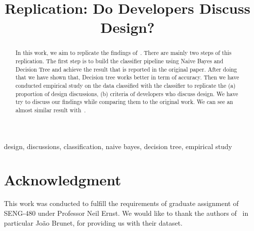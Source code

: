 \documentclass[conference]{IEEEtran}
\begin{document}

\title{Replication: Do Developers Discuss Design?}

\author{
}

\makeatletter
{}
\makeatother

\maketitle

\begin{abstract}
In this work, we aim to replicate the findings of~\cite{Brunet2014a}. There are mainly two steps of this replication. The first step is to build the classifier pipeline using Naive Bayes and Decision Tree and achieve the result that is reported in the original paper. After doing that we have shown that, Decision tree works better in term of accuracy. Then we have conducted empirical study on the data classified with the classifier to replicate the (a) proportion of design discussions, (b) criteria of developers who discuss design. We have try to discuss our findings while comparing them to the original work. We can see an almost similar result with~\cite{Brunet2014a}.  
\end{abstract}

\begin{IEEEkeywords}
design, discussions, classification, naive bayes, decision tree, empirical study
\end{IEEEkeywords}








\section*{Acknowledgment}
This work was conducted to fulfill the requirements of graduate assignment of SENG-480 under Professor Neil Ernst. We would like to thank the authors of~\cite{Brunet2014a} in particular Jo\~{a}o Brunet, for providing us with their dataset. 




\end{document}
